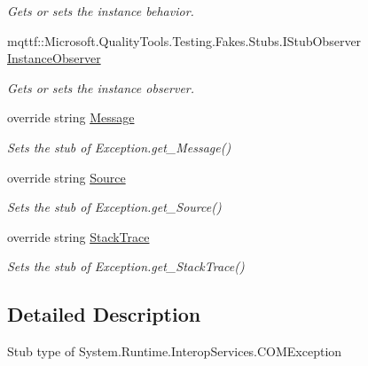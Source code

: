 \begin{DoxyCompactItemize}
\begin{DoxyCompactList}\small\item\em Gets or sets the instance behavior.\end{DoxyCompactList}\item 
mqttf\-::\-Microsoft.\-Quality\-Tools.\-Testing.\-Fakes.\-Stubs.\-I\-Stub\-Observer \hyperlink{class_system_1_1_runtime_1_1_interop_services_1_1_fakes_1_1_stub_c_o_m_exception_a4f3aa94e91ee0bcb8d5f3ae31ed446ff}{Instance\-Observer}
\begin{DoxyCompactList}\small\item\em Gets or sets the instance observer.\end{DoxyCompactList}\item 
override string \hyperlink{class_system_1_1_runtime_1_1_interop_services_1_1_fakes_1_1_stub_c_o_m_exception_ab976155d485606513b6110a51dd36335}{Message}
\begin{DoxyCompactList}\small\item\em Sets the stub of Exception.\-get\-\_\-\-Message()\end{DoxyCompactList}\item 
override string \hyperlink{class_system_1_1_runtime_1_1_interop_services_1_1_fakes_1_1_stub_c_o_m_exception_a6d206a4389618e6d53ee52db095c06f0}{Source}
\begin{DoxyCompactList}\small\item\em Sets the stub of Exception.\-get\-\_\-\-Source()\end{DoxyCompactList}\item 
override string \hyperlink{class_system_1_1_runtime_1_1_interop_services_1_1_fakes_1_1_stub_c_o_m_exception_a547d0dc6ad8e8085a304927a7ffe11d9}{Stack\-Trace}
\begin{DoxyCompactList}\small\item\em Sets the stub of Exception.\-get\-\_\-\-Stack\-Trace()\end{DoxyCompactList}\end{DoxyCompactItemize}


\subsection{Detailed Description}
Stub type of System.\-Runtime.\-Interop\-Services.\-C\-O\-M\-Exception



